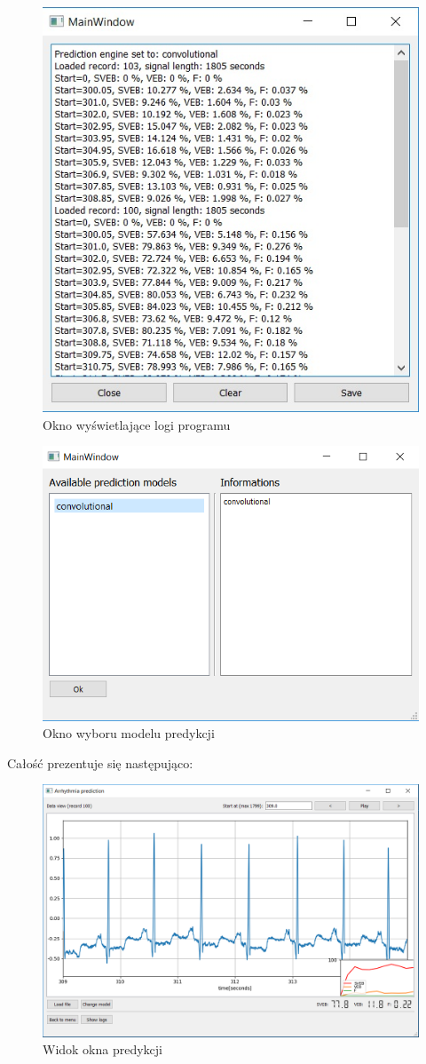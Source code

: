 \documentclass[polish,12pt]{aghthesis}
\begin{document}
\begin{figure}[H]
	\centering
	\includegraphics[width=0.6\linewidth]{logs.png}
	\caption{Okno wyświetlające logi programu}
	\label{fig:logs}
\end{figure}

\begin{figure}[H]
	\centering
	\includegraphics[width=0.6\linewidth]{models.png}
	\caption{Okno wyboru modelu predykcji}
	\label{fig:models}
\end{figure}

Całość prezentuje się następująco:

\begin{figure}[H]
	\centering
	\includegraphics[width=0.9\linewidth]{prediction.png}
	\caption{Widok okna predykcji}
	\label{fig:prediction}
\end{figure}
\end{document}
